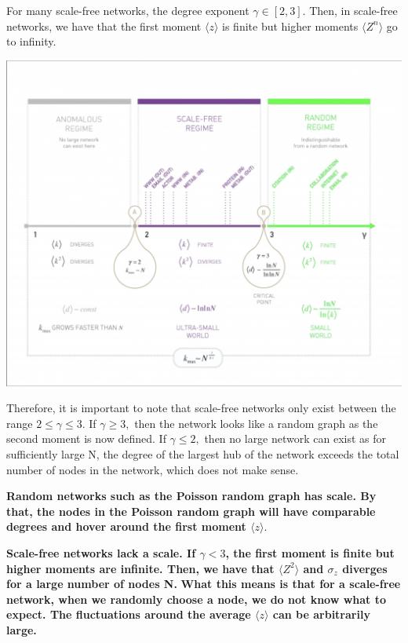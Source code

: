 \documentclass[twoside]{article}
\begin{document}
For many scale-free networks, the degree exponent $\gamma \in [2,3].$ Then, in scale-free networks, we have that the first moment $\langle z \rangle$ is finite but higher moments $\langle Z^n \rangle$ go to infinity.

\begin{center}
\includegraphics[scale=0.4]{Scale-free-regimes}
\end{center}

Therefore, it is important to note that scale-free networks only exist between the range $2 \leq \gamma \leq 3.$ If $\gamma \geq 3,$ then the network looks like a random graph as the second moment is now defined. If $\gamma \leq 2,$ then no large network can exist as for sufficiently large N, the degree of the largest hub of the network exceeds the total number of nodes in the network, which does not make sense.


\textbf{Random networks such as the Poisson random graph has scale. By that, the nodes in the Poisson random graph will have comparable degrees and hover around the first moment $\langle z \rangle.$}

\textbf{Scale-free networks lack a scale. If $\gamma < 3$, the first moment is finite but higher moments are infinite. Then, we have that $\langle Z^2 \rangle$ and $\sigma_z$ diverges for a large number of nodes N.} \textbf{What this means is that for a scale-free network, when we randomly choose a node, we do not know what to expect. The fluctuations around the average $\langle z \rangle$ can be arbitrarily large.} 
\end{document}
